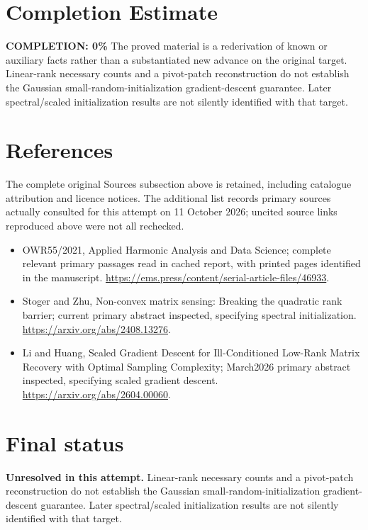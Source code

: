 \documentclass[11pt]{article}
\begin{document}
\section{Completion Estimate}
\noindent\textbf{COMPLETION: 0\%}
The proved material is a rederivation of known or auxiliary facts rather than a substantiated new advance on the original target. Linear-rank necessary counts and a pivot-patch reconstruction do not establish the Gaussian small-random-initialization gradient-descent guarantee. Later spectral/scaled initialization results are not silently identified with that target.
\section{References}
The complete original Sources subsection above is retained, including catalogue attribution and licence notices. The additional list records primary sources actually consulted for this attempt on 11 October 2026; uncited source links reproduced above were not all rechecked.
\begin{itemize}
\item OWR55/2021, Applied Harmonic Analysis and Data Science; complete relevant primary passages read in cached report, with printed pages identified in the manuscript. \url{https://ems.press/content/serial-article-files/46933}.
\item Stoger and Zhu, Non-convex matrix sensing: Breaking the quadratic rank barrier; current primary abstract inspected, specifying spectral initialization. \url{https://arxiv.org/abs/2408.13276}.
\item Li and Huang, Scaled Gradient Descent for Ill-Conditioned Low-Rank Matrix Recovery with Optimal Sampling Complexity; March2026 primary abstract inspected, specifying scaled gradient descent. \url{https://arxiv.org/abs/2604.00060}.
\end{itemize}
\section{Final status}
\textbf{Unresolved in this attempt.} Linear-rank necessary counts and a pivot-patch reconstruction do not establish the Gaussian small-random-initialization gradient-descent guarantee. Later spectral/scaled initialization results are not silently identified with that target.
\end{document}
